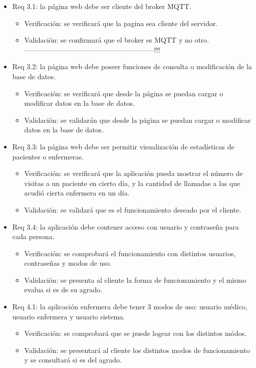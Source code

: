 \documentclass[
11pt, %
]{charter}
\begin{document}
\begin{itemize}
\item Req 3.1: la página web debe ser cliente del broker MQTT.
	\begin{itemize}
	\item Verificación: se verificará que la pagina sea cliente del servidor.
	\item Validación:  se confirmará que el broker es MQTT y no otro.--------------------------------------------------------!!!
	\end{itemize}
\item Req 3.2: la página web debe poseer funciones de consulta o modificación de la base de datos.
	\begin{itemize}
	\item Verificación: se verificará que desde la página se puedan cargar o modificar datos en la base de datos.
	\item Validación:  se validarán que desde la página se puedan cargar o modificar datos en la base de datos.
	\end{itemize}
\item Req 3.3: la página web debe ser permitir visualización de estadísticas de pacientes o enfermeras. 
	\begin{itemize}
	\item Verificación: se verificará que la aplicación pueda mostrar el número de visitas a un paciente en cierto día, y la cantidad de llamadas a las que acudió cierta enfermera en un día.
	\item Validación:  se validará que es el funcionamiento deseado por el cliente.
	\end{itemize}	
\item Req 3.4: la aplicación debe contener acceso con usuario y contraseña para cada persona. 
	\begin{itemize}
	\item Verificación: se comprobará el funcionamiento con distintos usuarios, contraseñas y modos de uso.
	\item Validación:  se presenta al cliente la forma de funcionamiento y el mismo evalua si es de su agrado.
	\end{itemize}		
\item Req 4.1: la aplicación enfermera debe tener 3 modos de uso: usuario médico, usuario enfermera y usuario sistema.
	\begin{itemize}
	\item Verificación: se comprobará que se puede logear con los distintos módos.
	\item Validación: se presentará al cliente los distintos modos de funcionamiento y se consultará si es del agrado.
	\end{itemize}		


\end{itemize}
\end{document}

